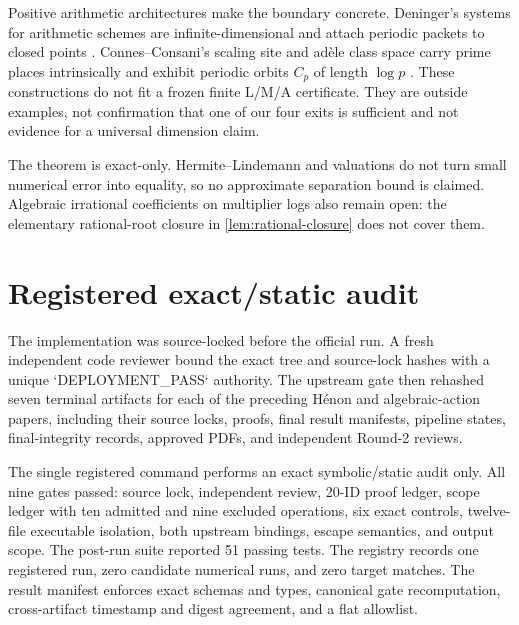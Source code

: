 \documentclass[11pt]{article}
\theoremstyle{definition}
\theoremstyle{remark}
\begin{document}
Positive arithmetic architectures make the boundary concrete.  Deninger's
systems for arithmetic schemes are infinite-dimensional and attach periodic
packets to closed points \citep{deninger_2026}.  Connes--Consani's scaling
site and ad\`ele class space carry prime places intrinsically and exhibit
periodic orbits $C_p$ of length $\log p$
\citep{connes_consani_2016,connes_consani_2024}.  These constructions do not
fit a frozen finite L/M/A certificate.  They are outside examples, not
confirmation that one of our four exits is sufficient and not evidence for a
universal dimension claim.

The theorem is exact-only.  Hermite--Lindemann and valuations do not turn
small numerical error into equality, so no approximate separation bound is
claimed.  Algebraic irrational coefficients on multiplier logs also remain
open: the elementary rational-root closure in
\cref{lem:rational-closure} does not cover them.

\section{Registered exact/static audit}
\label{sec:audit}

The implementation was source-locked before the official run.  A fresh
independent code reviewer bound the exact tree and source-lock hashes with a
unique `DEPLOYMENT\_PASS` authority.  The upstream gate then rehashed seven
terminal artifacts for each of the preceding H\'enon and algebraic-action
papers, including their source locks, proofs, final result manifests,
pipeline states, final-integrity records, approved PDFs, and independent
Round-2 reviews.

The single registered command performs an exact symbolic/static audit only.
All nine gates passed: source lock, independent review, 20-ID proof ledger,
scope ledger with ten admitted and nine excluded operations, six exact
controls, twelve-file executable isolation, both upstream bindings, escape
semantics, and output scope.  The post-run suite reported 51 passing tests.
The registry records one registered run, zero candidate numerical runs, and
zero target matches.  The result manifest enforces exact schemas and types,
canonical gate recomputation, cross-artifact timestamp and digest agreement,
and a flat allowlist.
\end{document}
